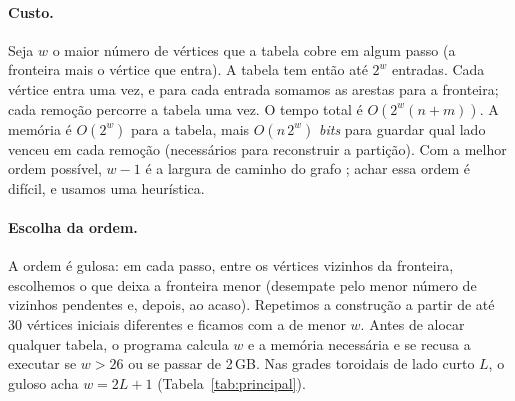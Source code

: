 \paragraph{Custo.} Seja $w$ o maior número de vértices que a tabela cobre em algum passo (a fronteira mais o vértice que entra). A tabela tem então até $2^{w}$ entradas. Cada vértice entra uma vez, e para cada entrada somamos as arestas para a fronteira; cada remoção percorre a tabela uma vez. O tempo total é $O(2^{w}(n+m))$. A memória é $O(2^{w})$ para a tabela, mais $O(n\,2^{w})$ \emph{bits} para guardar qual lado venceu em cada remoção (necessários para reconstruir a partição). Com a melhor ordem possível, $w-1$ é a largura de caminho do grafo \cite{Kinnersley 1992}; achar essa ordem é difícil, e usamos uma heurística.

\paragraph{Escolha da ordem.} A ordem é gulosa: em cada passo, entre os vértices vizinhos da fronteira, escolhemos o que deixa a fronteira menor (desempate pelo menor número de vizinhos pendentes e, depois, ao acaso). Repetimos a construção a partir de até 30 vértices iniciais diferentes e ficamos com a de menor $w$. Antes de alocar qualquer tabela, o programa calcula $w$ e a memória necessária e se recusa a executar se $w>26$ ou se passar de 2\,GB. Nas grades toroidais de lado curto $L$, o guloso acha $w=2L+1$ (Tabela~\ref{tab:principal}).
